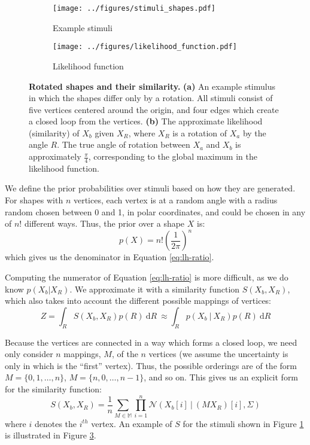 \documentclass{article} %
\begin{document}
\begin{figure}[t]
  \centering
  \begin{subfigure}[b]{0.45\textwidth}
    \centering
    \texttt{[image: ../figures/stimuli\_shapes.pdf]}
    \vspace{0pt}
    \caption{Example stimuli}
    \label{fig:stimuli}
  \end{subfigure}
  \begin{subfigure}[b]{0.45\textwidth}
    \centering
    \texttt{[image: ../figures/likelihood\_function.pdf]}
    \caption{Likelihood function}
    \label{fig:likelihood}
  \end{subfigure}
  \caption{\textbf{Rotated shapes and their similarity.}  \textbf{(a)}
    An example stimulus in which the shapes differ only by a
    rotation. All stimuli consist of five vertices centered around the
    origin, and four edges which create a closed loop from the
    vertices. \textbf{(b)} The approximate likelihood (similarity) of
    $X_b$ given $X_R$, where $X_R$ is a rotation of $X_a$ by the angle
    $R$. The true angle of rotation between $X_a$ and $X_b$ is
    approximately $\frac{\pi}{4}$, corresponding to the global maximum
    in the likelihood function.}
\end{figure}

We define the prior probabilities over stimuli based on how they are
generated. For shapes with $n$ vertices, each vertex is at a random
angle with a radius random chosen between 0 and 1, in polar
coordinates, and could be chosen in any of $n!$ different ways. Thus,
the prior over a shape $X$ is:
\begin{equation}
  p(X)=n!\left(\frac{1}{2\pi}\right)^n
  \label{eq:prior}
\end{equation} 
which gives us the denominator in Equation \ref{eq:lh-ratio}. 

Computing the numerator of Equation \ref{eq:lh-ratio} is more
difficult, as we do know $p(X_b\vert X_R)$. We approximate it with a
similarity function $S(X_b, X_R)$, which also takes into account the
different possible mappings of vertices:
\begin{equation}
  Z=\int_R S(X_b, X_R)p(R)\ \mathrm{d}R\ \approx\int_Rp(X_b\ \vert\ X_R)p(R)\ \mathrm{d}R
  \label{eq:Z}
\end{equation}

Because the vertices are connected in a way which forms a closed loop,
we need only consider $n$ mappings, $M$, of the $n$ vertices (we
assume the uncertainty is only in which is the ``first''
vertex). Thus, the possible orderings are of the form $M=\lbrace{}0,
1, \ldots{}, n\rbrace{}$, $M=\lbrace{}n, 0, \ldots{}, n-1\rbrace{}$,
and so on. This gives us an explicit form for the similarity function:
\begin{equation}
  S(X_b, X_R)=\frac{1}{n}\sum_{M\in\mathbb{M}}\prod_{i=1}^n\mathcal{N}(X_b[i]\ \vert \ (MX_R)[i], \Sigma)
  \label{eq:similarity}
\end{equation}
where $i$ denotes the $i^{th}$ vertex. An example of $S$ for the
stimuli shown in Figure \ref{fig:stimuli} is illustrated in Figure
\ref{fig:likelihood}.
\end{document}

